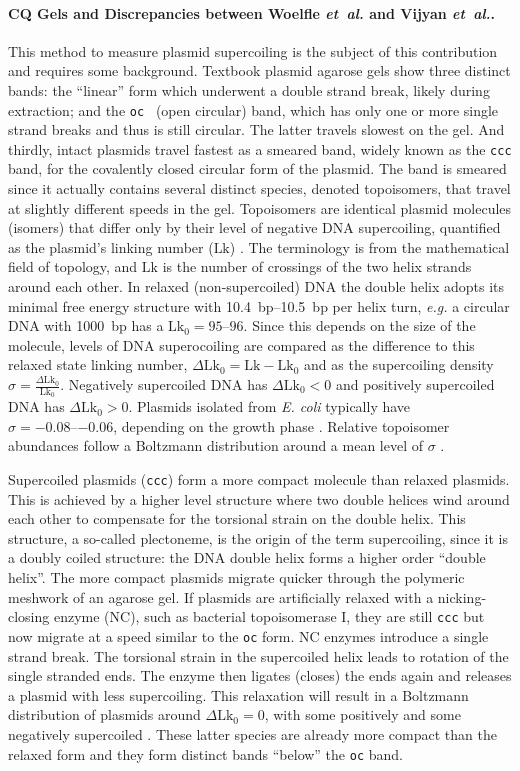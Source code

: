 \documentclass[10pt,a4]{article}
\def\cite#1{\hypersetup{citecolor=Teal}\citep{#1}} %
\newcommand{\lk}{\ensuremath{\text{Lk}}}
\newcommand{\lkr}{\ensuremath{\text{Lk}_0}}
\newcommand{\dlkr}{\ensuremath{\Delta\text{Lk}_0}}
\newcommand{\etal}{\textit{et~al.}}
\newcommand{\eg}{\textit{e.g.}}
\begin{document}
\paragraph{CQ Gels and Discrepancies between Woelfle \etal{} and Vijyan \etal{}.}
This method to measure plasmid supercoiling is the subject of this
contribution and requires some background.  Textbook plasmid agarose
gels show three distinct bands: the ``linear'' form which underwent a
double strand break, likely during extraction; and the \texttt{oc }
(open circular) band, which has only one or more single strand breaks
and thus is still circular. The latter travels slowest on the gel. And
thirdly, intact plasmids travel fastest as a smeared band, widely
known as the \texttt{ccc} band, for the covalently closed circular
form of the plasmid. The band is smeared since it actually contains
several distinct species, denoted topoisomers, that travel at slightly
different speeds in the gel.
%
Topoisomers are identical plasmid molecules (isomers) that differ only
by their level of negative DNA supercoiling, quantified as the
plasmid's linking number (\lk{}) \cite{Crick1976}. The terminology is
from the mathematical field of topology, and \lk{} is the number of
crossings of the two helix strands around each other.  In relaxed
(non-supercoiled) DNA the double helix adopts its minimal free energy
structure with \SIrange{10.4}{10.5}{bp} per helix turn, \eg{} a
circular DNA with \SI{1000}{bp} has a $\lkr=\numrange{95}{96}$. Since
this depends on the size of the molecule, levels of DNA superocoiling
are compared as the difference to this relaxed state linking number,
$\dlkr=\lk-\lkr$ and as the supercoiling density
$\sigma=\frac{\dlkr}{\lkr}$.  Negatively supercoiled DNA has $\dlkr<0$
and positively supercoiled DNA has $\dlkr>0$.  Plasmids isolated from
\textit{E. coli} typically have $\sigma=\numrange{-0.08}{-0.06}$,
depending on the growth phase \cite{Liu2018}. Relative topoisomer
abundances follow a Boltzmann distribution around a mean level of
$\sigma$ \cite{Pulleyblank1975, Depew1975, Keller1975b}.

Supercoiled plasmids (\texttt{ccc}) form a more compact molecule than
relaxed plasmids. This is achieved by a higher level structure where
two double helices wind around each other to compensate for the
torsional strain on the double helix. This structure, a so-called
plectoneme, is the origin of the term supercoiling, since it is a
doubly coiled structure: the DNA double helix forms a higher order
``double helix''. The more compact plasmids migrate quicker through
the polymeric meshwork of an agarose gel.
%
If plasmids are artificially relaxed with a nicking-closing enzyme
(NC), such as bacterial topoisomerase I, they are still \texttt{ccc} but
now migrate at a speed similar to the \texttt{oc} form. NC enzymes
introduce a single strand break. The torsional strain in the
supercoiled helix leads to rotation of the single stranded ends. The
enzyme then ligates (closes) the ends again and releases a plasmid
with less supercoiling. This relaxation will result in a Boltzmann
distribution of plasmids around $\dlkr=0$, with some 
positively and some negatively supercoiled \cite{Depew1975}.  These
latter species are already more compact than the relaxed form and they
form distinct bands ``below'' the \texttt{oc} band.
\end{document}
